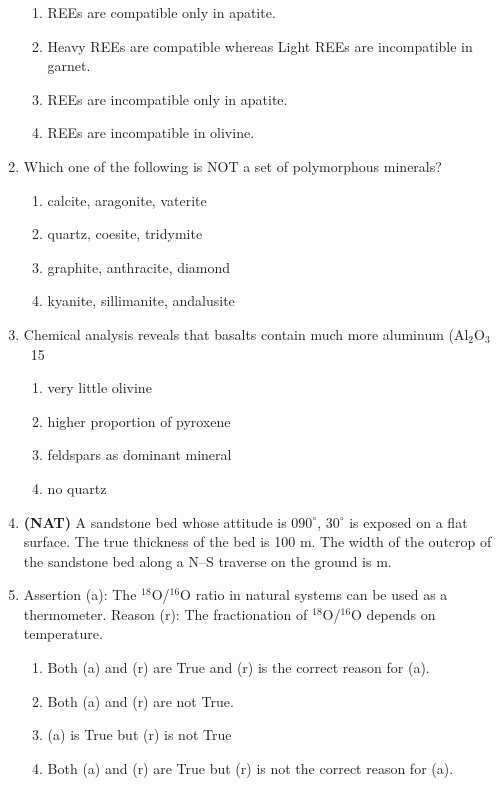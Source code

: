 \documentclass[journal,12pt,onecolumn]{IEEEtran}
\theoremstyle{remark}
\begin{document}
\begin{enumerate}
\begin{enumerate}
\item REEs are compatible only in apatite.  
\item Heavy REEs are compatible whereas Light REEs are incompatible in garnet.  
\item REEs are incompatible only in apatite.  
\item REEs are incompatible in olivine.  
\end{enumerate}

\item Which one of the following is NOT a set of polymorphous minerals?  
\begin{enumerate}
\item calcite, aragonite, vaterite  
\item quartz, coesite, tridymite  
\item graphite, anthracite, diamond  
\item kyanite, sillimanite, andalusite  
\end{enumerate}

\item Chemical analysis reveals that basalts contain much more aluminum (Al\(_2\)O\(_3\) ~15%
\begin{enumerate}
\item very little olivine  
\item higher proportion of pyroxene  
\item feldspars as dominant mineral  
\item no quartz  
\end{enumerate}

\item \textbf{(NAT)} A sandstone bed whose attitude is $090^\circ$, $30^\circ$ is exposed on a flat surface. The true thickness of the bed is 100 m. The width of the outcrop of the sandstone bed along a N--S traverse on the ground is \underline{\hspace{3cm}} m.
\vspace{0.3cm}

\item Assertion (a): The \(^{18}\)O/\(^{16}\)O ratio in natural systems can be used as a thermometer.  
Reason (r): The fractionation of \(^{18}\)O/\(^{16}\)O depends on temperature.  
\begin{enumerate}
\item Both (a) and (r) are True and (r) is the correct reason for (a).  
\item Both (a) and (r) are not True.  
\item (a) is True but (r) is not True  
\item Both (a) and (r) are True but (r) is not the correct reason for (a).  
\end{enumerate}


\end{enumerate}
\end{document}
